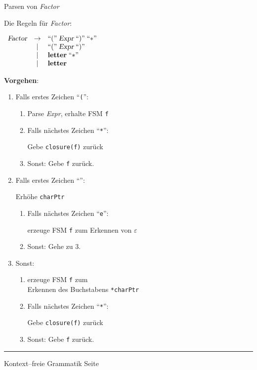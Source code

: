 \begin{slide}{}
\normalsize

\begin{center}
Parsen von \textsl{Factor}
\end{center}
\vspace*{0.5cm}

\footnotesize
Die Regeln f\"ur \textsl{Factor}:

$
\begin{array}{lcl}
\textsl{Factor} & \rightarrow & ``\mathtt{(}\cq \;\textsl{Expr}\; ``\mathtt{)}\cq \; ``\mathtt{*}\cq \\
              & |           & ``\mathtt{(}\cq \;\textsl{Expr}\; ``\mathtt{)}\cq                    \\
              & |           & \mathbf{letter}\; ``\mathtt{*}\cq                                    \\
              & |           & \mathbf{letter}                                                      \\
\end{array}
$

\textbf{Vorgehen}:
\begin{enumerate}
\item Falls erstes Zeichen ``\texttt{(}'':
      \begin{enumerate}
      \item Parse \textsl{Expr}, erhalte FSM \texttt{f}
      \item Falls n\"achstes Zeichen ``\texttt{*}'':

            Gebe \texttt{closure(f)} zur\"uck
      \item Sonst: Gebe \texttt{f} zur\"uck.
      \end{enumerate}
\item Falls erstes Zeichen ``\texttt{}'':

      Erh\"ohe \texttt{charPtr}
      \begin{enumerate}
      \item Falls n\"achstes Zeichen ``\texttt{e}'':

            erzeuge FSM \texttt{f} zum Erkennen von $\varepsilon$
      \item Sonst: Gehe zu 3.
      \end{enumerate}
\item Sonst:
      \begin{enumerate}
      \item erzeuge FSM \texttt{f} zum \\ 
            Erkennen  des Buchstabens \texttt{*charPtr}
      \item Falls n\"achstes Zeichen ``\texttt{*}'':

            Gebe \texttt{closure(f)} zur\"uck
      \item Sonst: Gebe \texttt{f} zur\"uck.
      \end{enumerate}
\end{enumerate}

\vspace*{\fill}
\tiny \addtocounter{mypage}{1}
\rule{17cm}{1mm}
Kontext--freie Grammatik  \hspace*{\fill} Seite 
\end{slide}

